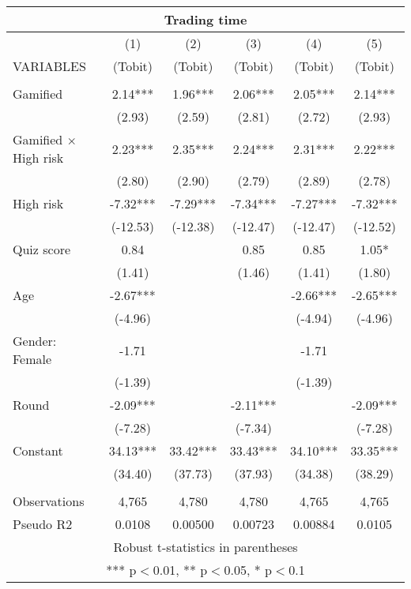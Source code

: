 \documentclass[]{article}
\begin{document}
\begin{tabular}{lccccc}
\multicolumn{6}{c}{Trading time} \\ \hline
 & (1) & (2) & (3) & (4) & (5) \\
VARIABLES & (Tobit) & (Tobit) & (Tobit) & (Tobit) & (Tobit) \\ \hline
 &  &  &  &  &  \\
Gamified & 2.14*** & 1.96*** & 2.06*** & 2.05*** & 2.14*** \\
 & (2.93) & (2.59) & (2.81) & (2.72) & (2.93) \\
Gamified $\times$ High risk & 2.23*** & 2.35*** & 2.24*** & 2.31*** & 2.22*** \\
 & (2.80) & (2.90) & (2.79) & (2.89) & (2.78) \\
High risk & -7.32*** & -7.29*** & -7.34*** & -7.27*** & -7.32*** \\
 & (-12.53) & (-12.38) & (-12.47) & (-12.47) & (-12.52) \\
Quiz score & 0.84 &  & 0.85 & 0.85 & 1.05* \\
 & (1.41) &  & (1.46) & (1.41) & (1.80) \\
Age & -2.67*** &  &  & -2.66*** & -2.65*** \\
 & (-4.96) &  &  & (-4.94) & (-4.96) \\
Gender: Female & -1.71 &  &  & -1.71 &  \\
 & (-1.39) &  &  & (-1.39) &  \\
Round & -2.09*** &  & -2.11*** &  & -2.09*** \\
 & (-7.28) &  & (-7.34) &  & (-7.28) \\
Constant & 34.13*** & 33.42*** & 33.43*** & 34.10*** & 33.35*** \\
 & (34.40) & (37.73) & (37.93) & (34.38) & (38.29) \\
 &  &  &  &  &  \\
Observations & 4,765 & 4,780 & 4,780 & 4,765 & 4,765 \\
 Pseudo R2 & 0.0108 & 0.00500 & 0.00723 & 0.00884 & 0.0105 \\ \hline
\multicolumn{6}{c}{ Robust t-statistics in parentheses} \\
\multicolumn{6}{c}{ *** p$<$0.01, ** p$<$0.05, * p$<$0.1} \\
\end{tabular}
\end{document}
